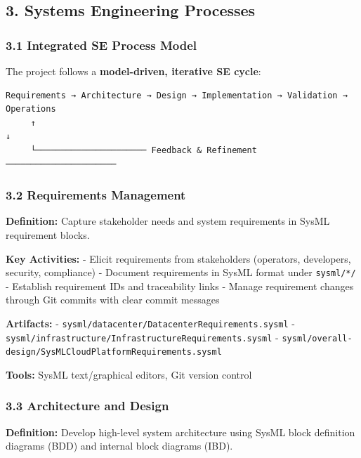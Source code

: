 \documentclass[12pt]{article}
\begin{document}
\subsection{3. Systems Engineering
Processes}\label{systems-engineering-processes}

\subsubsection{3.1 Integrated SE Process
Model}\label{integrated-se-process-model}

The project follows a \textbf{model-driven, iterative SE cycle}:

\begin{verbatim}
Requirements → Architecture → Design → Implementation → Validation → Operations
     ↑                                                                    ↓
     └────────────────────── Feedback & Refinement ──────────────────────
\end{verbatim}

\subsubsection{3.2 Requirements
Management}\label{requirements-management}

\textbf{Definition:} Capture stakeholder needs and system requirements
in SysML requirement blocks.

\textbf{Key Activities:} - Elicit requirements from stakeholders
(operators, developers, security, compliance) - Document requirements in
SysML format under \texttt{sysml/*/} - Establish requirement IDs and
traceability links - Manage requirement changes through Git commits with
clear commit messages

\textbf{Artifacts:} -
\texttt{sysml/datacenter/DatacenterRequirements.sysml} -
\texttt{sysml/infrastructure/InfrastructureRequirements.sysml} -
\texttt{sysml/overall-design/SysMLCloudPlatformRequirements.sysml}

\textbf{Tools:} SysML text/graphical editors, Git version control

\subsubsection{3.3 Architecture and
Design}\label{architecture-and-design}

\textbf{Definition:} Develop high-level system architecture using SysML
block definition diagrams (BDD) and internal block diagrams (IBD).
\end{document}
